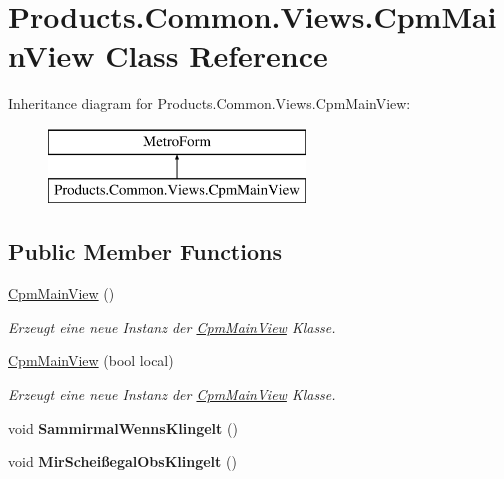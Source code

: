 \hypertarget{class_products_1_1_common_1_1_views_1_1_cpm_main_view}{}\section{Products.\+Common.\+Views.\+Cpm\+Main\+View Class Reference}
\label{class_products_1_1_common_1_1_views_1_1_cpm_main_view}
Inheritance diagram for Products.\+Common.\+Views.\+Cpm\+Main\+View\+:\begin{figure}[H]
\begin{center}
\leavevmode
\includegraphics[height=2.000000cm]{class_products_1_1_common_1_1_views_1_1_cpm_main_view}
\end{center}
\end{figure}
\subsection*{Public Member Functions}
\begin{DoxyCompactItemize}
\item 
\hyperlink{class_products_1_1_common_1_1_views_1_1_cpm_main_view_a90a9bf68fff9653e9d6819f0eca82a19}{Cpm\+Main\+View} ()
\begin{DoxyCompactList}\small\item\em Erzeugt eine neue Instanz der \hyperlink{class_products_1_1_common_1_1_views_1_1_cpm_main_view}{Cpm\+Main\+View} Klasse. \end{DoxyCompactList}\item 
\hyperlink{class_products_1_1_common_1_1_views_1_1_cpm_main_view_aa5bc91d3208aaa098cbd21d00fb245c8}{Cpm\+Main\+View} (bool local)
\begin{DoxyCompactList}\small\item\em Erzeugt eine neue Instanz der \hyperlink{class_products_1_1_common_1_1_views_1_1_cpm_main_view}{Cpm\+Main\+View} Klasse. \end{DoxyCompactList}\item 
void {\bfseries Sammirmal\+Wenns\+Klingelt} ()\hypertarget{class_products_1_1_common_1_1_views_1_1_cpm_main_view_abce47ff397a70d67e3282c99696147de}{}\label{class_products_1_1_common_1_1_views_1_1_cpm_main_view_abce47ff397a70d67e3282c99696147de}

\item 
void {\bfseries Mir\+Scheißegal\+Obs\+Klingelt} ()\hypertarget{class_products_1_1_common_1_1_views_1_1_cpm_main_view_ae8628fb17fac6d2eb9207d1057cd455d}{}\label{class_products_1_1_common_1_1_views_1_1_cpm_main_view_ae8628fb17fac6d2eb9207d1057cd455d}

\end{DoxyCompactItemize}
